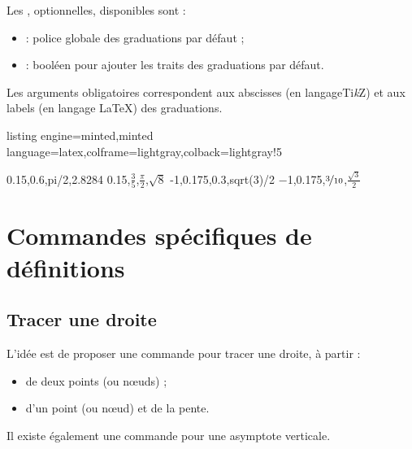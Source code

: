 \documentclass[11pt,a4paper]{ltxdoc}
\providecommand\tikzlogo{Ti\textit{k}Z}
\let\TikZ\tikzlogo
\begin{document}
Les \MontreCode{[clés]}, optionnelles, disponibles sont :

\smallskip

\begin{itemize}
	\item {} : police globale des graduations { par défaut} ;
	\item {} : booléen pour ajouter les traits des graduations { par défaut}.
\end{itemize}

\smallskip

Les arguments obligatoires correspondent aux abscisses (en langage\TikZ) et aux labels (en langage \LaTeX) des graduations.

\begin{tcblisting}{listing engine=minted,minted language=latex,colframe=lightgray,colback=lightgray!5}
\begin{GraphiqueTikz}%
	[x=2.75cm,y=3cm,
	Xmin=0,Xmax=3.5,Xgrille=pi/12,Xgrilles=pi/24,
	Ymin=-1.05,Ymax=1.05,Ygrille=0.2,Ygrilles=0.05]
	\TracerAxesGrilles[Grad=false,Elargir=2.5mm,]{}{}
	\RajouterValeursAxeX
		{0.15,0.6,pi/2,2.8284}
		{\num{0.15},$\frac35$,$\displaystyle\frac{\pi}{2}$,$\sqrt{8}$}
	\RajouterValeursAxeY
		{-1,0.175,0.3,sqrt(3)/2}
		{\num{-1},\num{0.175},$\nicefrac{3}{10}$,$\frac{\sqrt{3}}{2}$}
\end{GraphiqueTikz}
\end{tcblisting}

\pagebreak

\section{Commandes spécifiques de définitions}

\subsection{Tracer une droite}\label{tracdroite}

L'idée est de proposer une commande pour tracer une droite, à partir :

\begin{itemize}
	\item de deux points (ou nœuds) ;
	\item d'un point (ou nœud) et de la pente.
\end{itemize}

Il existe également une commande pour une asymptote verticale.
\end{document}
